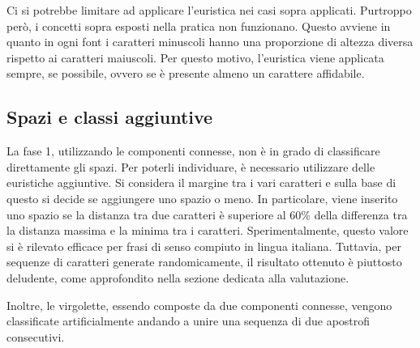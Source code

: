 Ci si potrebbe limitare ad applicare l'euristica nei casi sopra applicati. Purtroppo però, i concetti sopra esposti nella pratica non funzionano. Questo avviene in quanto in ogni font i caratteri minuscoli hanno una proporzione di altezza diversa rispetto ai caratteri maiuscoli. Per questo motivo, l'euristica viene applicata sempre, se possibile, ovvero se è presente almeno un carattere affidabile.

\subsection{Spazi e classi aggiuntive}

La fase 1, utilizzando le componenti connesse, non è in grado di classificare direttamente gli spazi. Per poterli individuare, è necessario utilizzare delle euristiche aggiuntive. Si considera il margine tra i vari caratteri e sulla base di questo si decide se aggiungere uno spazio o meno. In particolare, viene inserito uno spazio se la distanza tra due caratteri è superiore al 60\% della differenza tra la distanza massima e la minima tra i caratteri. Sperimentalmente, questo valore si è rilevato efficace per frasi di senso compiuto in lingua italiana. Tuttavia, per sequenze di caratteri generate randomicamente, il risultato ottenuto è piuttosto deludente, come approfondito nella sezione dedicata alla valutazione.

Inoltre, le virgolette, essendo composte da due componenti connesse, vengono classificate artificialmente andando a unire una sequenza di due apostrofi consecutivi.